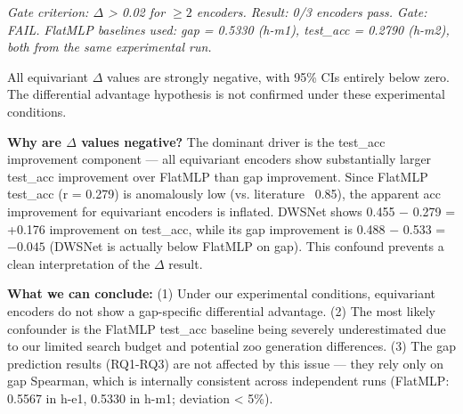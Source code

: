 \textit{Gate criterion: $\Delta$ > 0.02 for $\geq 2$ encoders. Result: 0/3 encoders pass. Gate: FAIL.}
\textit{FlatMLP baselines used: gap = 0.5330 (h-m1), test\_acc = 0.2790 (h-m2), both from the same experimental run.}

All equivariant $\Delta$ values are strongly negative, with 95\% CIs entirely below zero. The differential
advantage hypothesis is not confirmed under these experimental conditions.

\textbf{Why are $\Delta$ values negative?} The dominant driver is the test\_acc improvement component --- all
equivariant encoders show substantially larger test\_acc improvement over FlatMLP than gap improvement.
Since FlatMLP test\_acc (r = 0.279) is anomalously low (vs. literature ~0.85), the apparent acc
improvement for equivariant encoders is inflated. DWSNet shows 0.455 $-$ 0.279 = +0.176 improvement
on test\_acc, while its gap improvement is 0.488 $-$ 0.533 = $-0.045$ (DWSNet is actually below FlatMLP
on gap). This confound prevents a clean interpretation of the $\Delta$ result.

\textbf{What we can conclude:} (1) Under our experimental conditions, equivariant encoders do not show a
gap-specific differential advantage. (2) The most likely confounder is the FlatMLP test\_acc baseline
being severely underestimated due to our limited search budget and potential zoo generation differences.
(3) The gap prediction results (RQ1-RQ3) are not affected by this issue --- they rely only on gap
Spearman, which is internally consistent across independent runs (FlatMLP: 0.5567 in h-e1, 0.5330
in h-m1; deviation < 5\%).

